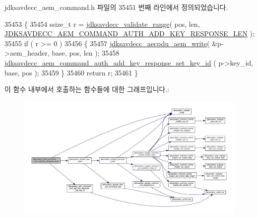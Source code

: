 jdksavdecc\+\_\+aem\+\_\+command.\+h 파일의 35451 번째 라인에서 정의되었습니다.


\begin{DoxyCode}
35453 \{
35454     ssize\_t r = \hyperlink{group__util_ga9c02bdfe76c69163647c3196db7a73a1}{jdksavdecc\_validate\_range}( pos, len, 
      \hyperlink{group__command__auth__add__key__response_gaf34e602f9d3603301ce41c98ca1e233b}{JDKSAVDECC\_AEM\_COMMAND\_AUTH\_ADD\_KEY\_RESPONSE\_LEN} );
35455     \textcolor{keywordflow}{if} ( r >= 0 )
35456     \{
35457         \hyperlink{group__aecpdu__aem_gad658e55771cce77cecf7aae91e1dcbc5}{jdksavdecc\_aecpdu\_aem\_write}( &p->aem\_header, base, pos, len );
35458         \hyperlink{group__command__auth__add__key__response_gaa2b18847ccb35b16314bb5e28c91587f}{jdksavdecc\_aem\_command\_auth\_add\_key\_response\_set\_key\_id}
      ( p->key\_id, base, pos );
35459     \}
35460     \textcolor{keywordflow}{return} r;
35461 \}
\end{DoxyCode}


이 함수 내부에서 호출하는 함수들에 대한 그래프입니다.\+:
\nopagebreak
\begin{figure}[H]
\begin{center}
\leavevmode
\includegraphics[width=350pt]{group__command__auth__add__key__response_ga416ab3e062a4fa7d2ab84b472772fedb_cgraph}
\end{center}
\end{figure}


